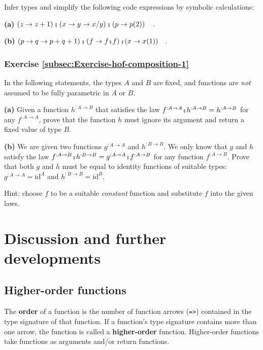 Infer types and simplify the following code expressions by symbolic
calculations:

\textbf{(a)} $\left(z\rightarrow z+1\right)\bef\left(x\rightarrow y\rightarrow x/y\right)\bef\left(p\rightarrow p(2)\right)\quad.$

\textbf{(b)} $\left(p\rightarrow q\rightarrow p+q+1\right)\bef\left(f\rightarrow f\bef f\right)\bef(x\rightarrow x(1))\quad.$

\subsubsection{Exercise \label{subsec:Exercise-hof-composition-1}\ref{subsec:Exercise-hof-composition-1}}

In the following statements, the types $A$ and $B$ are fixed, and
functions are \emph{not} assumed to be fully parametric in $A$ or
$B$.

\textbf{(a)} Given a function $h^{:A\rightarrow B}$ that satisfies
the law $f^{:A\rightarrow A}\bef h^{:A\rightarrow B}=h^{:A\rightarrow B}$
for any $f^{:A\rightarrow A}$, prove that the function $h$ must
ignore its argument and return a fixed value of type $B$.

\textbf{(b)} We are given two functions $g^{:A\rightarrow A}$ and
$h^{:B\rightarrow B}$. We only know that $g$ and $h$ satisfy the
law $f^{:A\rightarrow B}\bef h^{:B\rightarrow B}=g^{:A\rightarrow A}\bef f^{:A\rightarrow B}$
for any function $f^{:A\rightarrow B}$. Prove that both $g$ and
$h$ must be equal to identity functions of suitable types: $g^{:A\rightarrow A}=\text{id}^{A}$
and $h^{:B\rightarrow B}=\text{id}^{B}$.

Hint: choose $f$ to be a suitable \emph{constant} function and substitute
$f$ into the given laws.

\section{Discussion and further developments}

\subsection{Higher-order functions}

The \textbf{order} of a function is the
number of function arrows (\lstinline!=>!) contained in the type
signature of that function. If a function\textsf{'}s type signature contains
more than one arrow, the function is called a \textbf{higher-order}
function. Higher-order functions take functions as arguments and/or
return functions.

